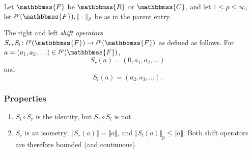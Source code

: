 \documentclass[12pt]{article}
\newcommand{\C}{\mathbbmss{C}}
\newcommand{\F}{\mathbbmss{F}}
\newcommand{\R}{\mathbbmss{R}}
\begin{document}
Let $\F$ be $\R$ or $\C$, and let $1\le p\le \infty$,
let $\ell^p(\F), \Vert\cdot \Vert_p$ be as in the parent entry.

The right and left \emph{shift operators}
   $S_r, S_l\colon \ell^p(\F)\to \ell^p(\F)$
as defined as follows. For $a=(a_1,a_2, \ldots)\in \ell^p(\F)$, 
$$
  S_r(a)=(0,a_1, a_2, \ldots)
$$
and 
$$
  S_l(a)=(a_2, a_3, \ldots).
$$

\subsubsection*{Properties}
\begin{enumerate}
\item $S_l \circ S_r$ is the identity, but $S_r\circ S_l$ is not. 
\item $S_r$ is an isometry; $\Vert S_r(a)\Vert = \Vert a \Vert$,
    and $\Vert S_l(a)\Vert_p \le \Vert a\Vert$. Both shift operators
    are therefore bounded (and continuous). 
\end{enumerate}
\end{document}
